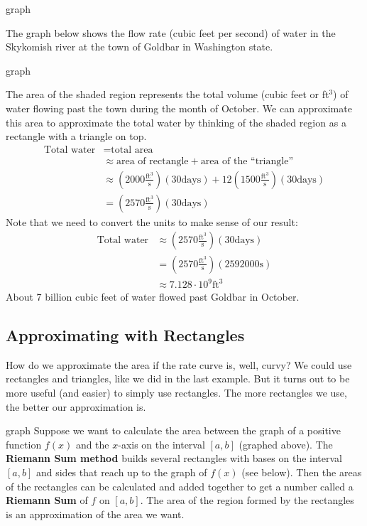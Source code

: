 graph
\begin{example}
The graph below shows the flow rate (cubic feet per second) of water in the Skykomish river at the town of Goldbar in Washington state.

graph
\begin{solution}
The area of the shaded region represents the total volume (cubic feet or ft$^3$) of water flowing past the town during the month of October. We can approximate this area to approximate the total water by thinking of the shaded region as a rectangle with a triangle on top.
\begin{align*}
\text{Total water} &= \text{total area} \\
  &\approx \text{area of rectangle} + \text{area of the ``triangle''}\\
  &\approx  \left(2000 \frac{\text{ft}^3}{\text{s}}\right)(30 \text{days})+12\left(1500\frac{\text{ft}^3}{\text{s}}\right)(30 \text{days})\\
  &= \left(2570 \frac{\text{ft}^3}{\text{s}}\right)(30 \text{days})
\end{align*}
Note that we need to convert the units to make sense of our result:
\begin{align*}
\text{Total water} &\approx  \left(2570 \frac{\text{ft}^3}{\text{s}}\right)(30 \text{days}) \\
  &=\left(2570 \frac{\text{ft}^3}{\text{s}}\right)(2592000 \text{s}) \\
  &\approx 7.128 \cdot 10^9 \text{ft}^3
\end{align*}
About 7 billion cubic feet of water flowed past Goldbar in October.
\end{solution}\end{example}

\subsection{Approximating with Rectangles}
How do we approximate the area if the rate curve is, well, curvy? We could use rectangles and triangles, like we did in the last example. But it turns out to be more useful (and easier) to simply use rectangles. The more rectangles we use, the better our approximation is.

graph
Suppose we want to calculate the area between the graph of a positive function $f(x)$ and the $x$-axis on the interval $[a,b]$ (graphed above). The {\bf Riemann Sum method} builds several rectangles with bases on the interval $[a,b]$ and sides that reach up to the graph of $f(x)$ (see below). Then the areas of the rectangles can be calculated and added together to get a number called a {\bf Riemann Sum} of $f$ on $[a,b]$. The area of the region formed by the rectangles is an approximation of the area we want.

